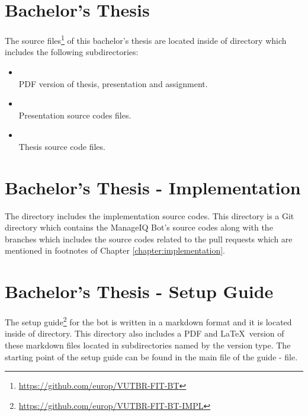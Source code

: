 \section{Bachelor's Thesis}\label{section:BT}

The source files\footnote{\url{https://github.com/europ/VUTBR-FIT-BT}} of this bachelor's thesis are located inside of  directory which includes the following subdirectories:

\begin{itemize}

    \item {}\\[0.2em]
        PDF version of thesis, presentation and assignment.

    \item {}\\[0.2em]
        Presentation source codes files.

    \item {}\\[0.2em]
        Thesis source code files.

\end{itemize}

\section{Bachelor's Thesis - Implementation}\label{section:BT-I}

The  directory includes the implementation source codes. This directory is a Git directory which contains the ManageIQ Bot's source codes along with the branches which includes the source codes related to the pull requests which are mentioned in footnotes of Chapter \ref{chapter:implementation}.

\section{Bachelor's Thesis - Setup Guide}\label{section:BT-SG}

The setup guide\footnote{\url{https://github.com/europ/VUTBR-FIT-BT-IMPL}} for the bot is written in a markdown format and it is located inside of  directory. This directory also includes a PDF and \LaTeX\ version of these markdown files located in subdirectories named by the version type. The starting point of the setup guide can be found in the main file of the guide -  file.
